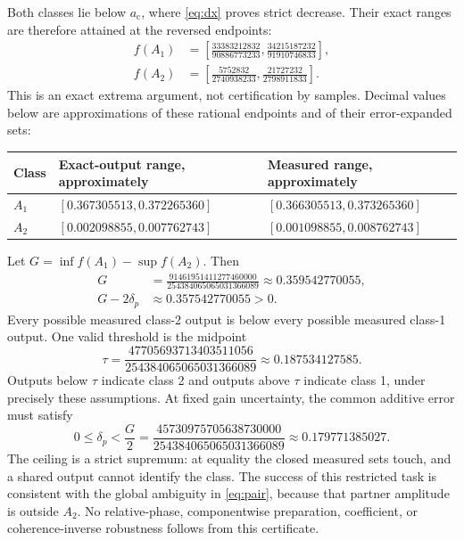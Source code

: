 \documentclass[11pt,a4paper]{article}
\newcommand{\ac}{a_{\mathrm c}}
\begin{document}
Both classes lie below $\ac$, where \eqref{eq:dx} proves strict decrease. Their exact ranges are therefore attained at the reversed endpoints:
\begin{align}
f(A_1)&=\left[\frac{33383212832}{90886773233},\frac{34215187232}{91910746833}\right],\label{eq:range1}\\
f(A_2)&=\left[\frac{5752832}{2740938233},\frac{21727232}{2798911833}\right].\label{eq:range2}
\end{align}
This is an exact extrema argument, not certification by samples. Decimal values below are approximations of these rational endpoints and of their error-expanded sets:
\begin{center}
\begin{tabular}{@{}lll@{}}
\toprule
Class & Exact-output range, approximately & Measured range, approximately\\\midrule
$A_1$ & $[0.367305513,0.372265360]$ & $[0.366305513,0.373265360]$\\
$A_2$ & $[0.002098855,0.007762743]$ & $[0.001098855,0.008762743]$\\\bottomrule
\end{tabular}
\end{center}
Let $G=\inf f(A_1)-\sup f(A_2)$. Then
\begin{align}
G&=\frac{91461951411277460000}{254384065065031366089}
\approx0.359542770055,\\
G-2\delta_p&\approx0.357542770055>0.\label{eq:gap}
\end{align}
Every possible measured class-2 output is below every possible measured class-1 output. One valid threshold is the midpoint
\begin{equation}
\tau=\frac{47705693713403511056}{254384065065031366089}
\approx0.187534127585.\label{eq:threshold}
\end{equation}
Outputs below $\tau$ indicate class 2 and outputs above $\tau$ indicate class 1, under precisely these assumptions. At fixed gain uncertainty, the common additive error must satisfy
\begin{equation}
0\le\delta_p<\frac G2=
\frac{45730975705638730000}{254384065065031366089}
\approx0.179771385027.\label{eq:ceiling}
\end{equation}
The ceiling is a strict supremum: at equality the closed measured sets touch, and a shared output cannot identify the class. The success of this restricted task is consistent with the global ambiguity in \eqref{eq:pair}, because that partner amplitude is outside $A_2$. No relative-phase, componentwise preparation, coefficient, or coherence-inverse robustness follows from this certificate.
\end{document}
